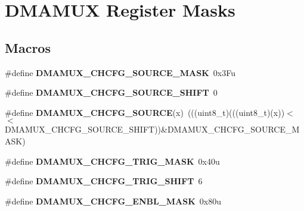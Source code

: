 \hypertarget{group__DMAMUX__Register__Masks}{}\section{D\+M\+A\+M\+UX Register Masks}
\label{group__DMAMUX__Register__Masks}
\subsection*{Macros}
\begin{DoxyCompactItemize}
\item 
\#define {\bfseries D\+M\+A\+M\+U\+X\+\_\+\+C\+H\+C\+F\+G\+\_\+\+S\+O\+U\+R\+C\+E\+\_\+\+M\+A\+SK}~0x3\+Fu\hypertarget{group__DMAMUX__Register__Masks_ga35b279ba0b1c9e817901494cdac305c5}{}\label{group__DMAMUX__Register__Masks_ga35b279ba0b1c9e817901494cdac305c5}

\item 
\#define {\bfseries D\+M\+A\+M\+U\+X\+\_\+\+C\+H\+C\+F\+G\+\_\+\+S\+O\+U\+R\+C\+E\+\_\+\+S\+H\+I\+FT}~0\hypertarget{group__DMAMUX__Register__Masks_gac2b7553c4599d8e919750598dd03f8a3}{}\label{group__DMAMUX__Register__Masks_gac2b7553c4599d8e919750598dd03f8a3}

\item 
\#define {\bfseries D\+M\+A\+M\+U\+X\+\_\+\+C\+H\+C\+F\+G\+\_\+\+S\+O\+U\+R\+CE}(x)~(((uint8\+\_\+t)(((uint8\+\_\+t)(x))$<$$<$D\+M\+A\+M\+U\+X\+\_\+\+C\+H\+C\+F\+G\+\_\+\+S\+O\+U\+R\+C\+E\+\_\+\+S\+H\+I\+FT))\&D\+M\+A\+M\+U\+X\+\_\+\+C\+H\+C\+F\+G\+\_\+\+S\+O\+U\+R\+C\+E\+\_\+\+M\+A\+SK)\hypertarget{group__DMAMUX__Register__Masks_ga26ed125b670223f11ea326335729bb9b}{}\label{group__DMAMUX__Register__Masks_ga26ed125b670223f11ea326335729bb9b}

\item 
\#define {\bfseries D\+M\+A\+M\+U\+X\+\_\+\+C\+H\+C\+F\+G\+\_\+\+T\+R\+I\+G\+\_\+\+M\+A\+SK}~0x40u\hypertarget{group__DMAMUX__Register__Masks_gafd2b6158f86bedffb640e73c40cdd0f5}{}\label{group__DMAMUX__Register__Masks_gafd2b6158f86bedffb640e73c40cdd0f5}

\item 
\#define {\bfseries D\+M\+A\+M\+U\+X\+\_\+\+C\+H\+C\+F\+G\+\_\+\+T\+R\+I\+G\+\_\+\+S\+H\+I\+FT}~6\hypertarget{group__DMAMUX__Register__Masks_ga714a6b142fde49d701e3f624bb2417e1}{}\label{group__DMAMUX__Register__Masks_ga714a6b142fde49d701e3f624bb2417e1}

\item 
\#define {\bfseries D\+M\+A\+M\+U\+X\+\_\+\+C\+H\+C\+F\+G\+\_\+\+E\+N\+B\+L\+\_\+\+M\+A\+SK}~0x80u\hypertarget{group__DMAMUX__Register__Masks_ga311ccb0a9a00f29da44f8c41b33ba79f}{}\label{group__DMAMUX__Register__Masks_ga311ccb0a9a00f29da44f8c41b33ba79f}


\end{DoxyCompactItemize}
